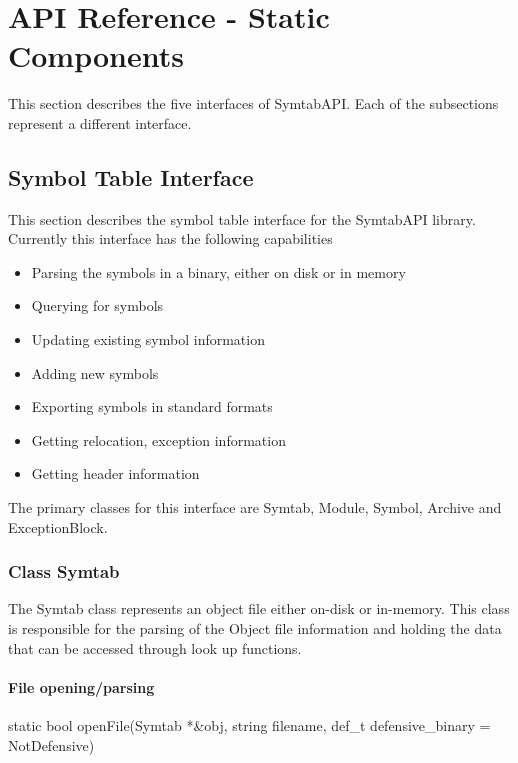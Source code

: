 \section{API Reference - Static Components}
This section describes the five interfaces of SymtabAPI. Each of the subsections represent a different interface.

\subsection{Symbol Table Interface}
This section describes the symbol table interface for the SymtabAPI library. Currently this interface has the following capabilities
\begin{itemize}
    \item Parsing the symbols in a binary, either on disk or in memory 
    \item Querying for symbols 
    \item Updating existing symbol information
    \item Adding new symbols 
    \item Exporting symbols in standard formats
    \item Getting relocation, exception information
    \item Getting header information
\end{itemize}
The primary classes for this interface are Symtab, Module, Symbol, Archive and ExceptionBlock.

\subsubsection{Class Symtab}

The Symtab class represents an object file either on-disk or in-memory. This class is responsible for the parsing of the Object file information and holding the data that can be accessed through look up functions.

\paragraph{File opening/parsing}

\begin{apient}
static bool openFile(Symtab *&obj, string filename,
                     def_t defensive_binary = NotDefensive)
\end{apient}

